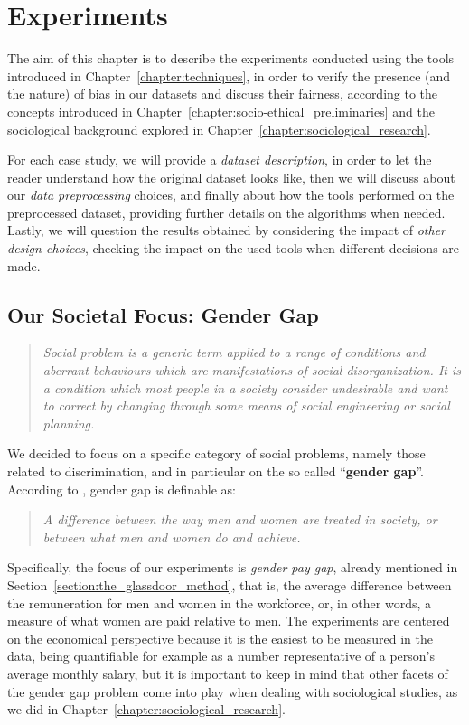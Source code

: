 \chapter{Experiments}
\label{chapter:experiments}
\thispagestyle{empty}

The aim of this chapter is to describe the experiments conducted using the tools introduced in Chapter~\ref{chapter:techniques}, in order to verify the presence (and the nature) of bias in our datasets and discuss their fairness, according to the concepts introduced in Chapter~\ref{chapter:socio-ethical_preliminaries} and the sociological background explored in Chapter~\ref{chapter:sociological_research}.

For each case study, we will provide a \textit{dataset description}, in order to let the reader understand how the original dataset looks like, then we will discuss about our \textit{data preprocessing} choices, and finally about how the tools performed on the preprocessed dataset, providing further details on the algorithms when needed. Lastly, we will question the results obtained by considering the impact of \textit{other design choices}, checking the impact on the used tools when different decisions are made.


\section{Our Societal Focus: Gender Gap}
\begin{quote}\emph{Social problem is a generic term applied to a range of conditions and aberrant behaviours which are manifestations of social disorganization. It is a condition which most people in a society consider undesirable and want to correct by changing through some means of social engineering or social planning.} \cite{marschall1998oxford}\end{quote}
We decided to focus on a specific category of social problems, namely those related to discrimination, and in particular on the so called ``\textbf{gender gap}''. According to \cite{cambridge2013gender}, gender gap is definable as:
\begin{quote}\emph{A difference between the way men and women are treated in society, or between what men and women do and achieve.} \cite{cambridge2013gender}\end{quote}
Specifically, the focus of our experiments is \textit{gender pay gap}, already mentioned in Section~\ref{section:the_glassdoor_method}, that is, the average difference between the remuneration for men and women in the workforce, or, in other words, a measure of what women are paid relative to men. The experiments are centered on the economical perspective because it is the easiest to be measured in the data, being quantifiable for example as a number representative of a person's average monthly salary, but it is important to keep in mind that other facets of the gender gap problem come into play when dealing with sociological studies, as we did in Chapter~\ref{chapter:sociological_research}.


